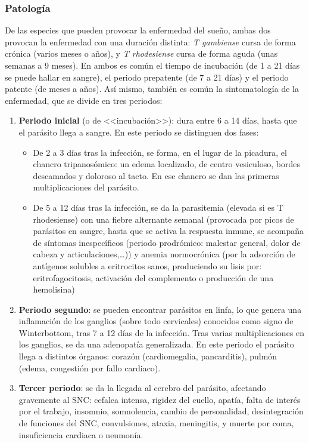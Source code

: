 \subsubsection{Patología}
De las especies que pueden provocar la enfermedad del sueño, ambas dos provocan la enfermedad con una duración distinta: \textit{T gambiense} cursa de forma crónica (varios meses o años), y \textit{T rhodesiense} cursa de forma aguda (unas semanas a 9 meses). En ambos es común el tiempo de incubación (de 1 a 21 días se puede hallar en sangre), el periodo prepatente (de 7 a 21 días) y el periodo patente (de meses a años). Así mismo, también es común la sintomatología de la enfermedad, que se divide en tres periodos:
\begin{enumerate}[itemsep=0pt,parsep=0pt,topsep=0pt,partopsep=0pt]
	\item \textbf{Periodo inicial} (o de <<incubación>>): dura entre 6 a 14 días, hasta que el parásito llega a sangre. En este periodo se distinguen dos fases:
	\begin{itemize}[itemsep=0pt,parsep=0pt,topsep=0pt,partopsep=0pt]
		\item De 2 a 3 días tras la infección, se forma, en el lugar de la picadura, el chancro tripanosómico: un edema localizado, de centro vesiculoso, bordes descamados y doloroso al tacto. En ese chancro se dan las primeras multiplicaciones del parásito.
		\item De 5 a 12 días tras la infección, se da la parasitemia (elevada si es T rhodesiense) con una fiebre alternante semanal (provocada por picos de parásitos en sangre, hasta que se activa la respuesta inmune, se acompaña de síntomas inespecíficos (periodo prodrómico: malestar general, dolor de cabeza y articulaciones,…)) y anemia normocrónica (por la adsorción de antígenos solubles a eritrocitos sanos, produciendo su lisis por: eritrofagocitosis, activación del complemento o producción de una hemolisina)
	\end{itemize}
	\item \textbf{Periodo segundo}: se pueden encontrar parásitos en linfa, lo que genera una inflamación de los ganglios (sobre todo cervicales) conocidos como signo de Winterbottom, tras 7 a 12 días de la infección. Tras varias multiplicaciones en los ganglios, se da una adenopatía generalizada. En este periodo el parásito llega a distintos órganos: corazón (cardiomegalia, pancarditis), pulmón (edema, congestión por fallo cardiaco).
	\item \textbf{Tercer periodo}: se da la llegada al cerebro del parásito, afectando gravemente al SNC: cefalea intensa, rigidez del cuello, apatía, falta de interés por el trabajo, insomnio, somnolencia, cambio de personalidad, desintegración de funciones del SNC, convulsiones, ataxia, meningitis, y muerte por coma, insuficiencia cardiaca o neumonía.
\end{enumerate}
